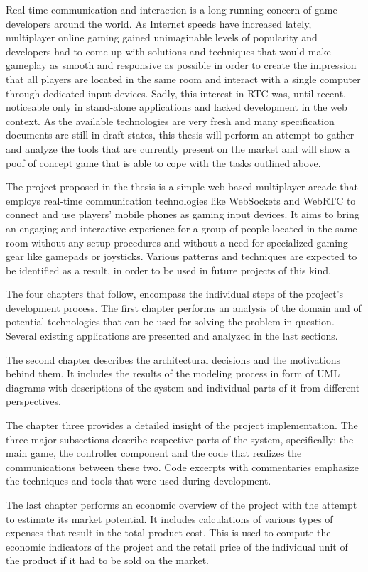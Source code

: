 Real-time communication and interaction is a long-running concern of game
developers around the world. As Internet speeds have increased lately,
multiplayer online gaming gained unimaginable levels of popularity and
developers had to come up with solutions and techniques that would make gameplay
as smooth and responsive as possible in order to create the impression that all
players are located in the same room and interact with a single computer through
dedicated input devices. Sadly, this interest in RTC was, until recent,
noticeable only in stand-alone applications and lacked development in the web
context. As the available technologies are very fresh and many specification
documents are still in draft states, this thesis will perform an attempt to
gather and analyze the tools that are currently present on the market and will
show a poof of concept game that is able to cope with the tasks outlined above.

The project proposed in the thesis is a simple web-based multiplayer arcade that
employs real-time communication technologies like WebSockets and WebRTC to
connect and use players' mobile phones as gaming input devices. It aims to bring
an engaging and interactive experience for a group of people located in the same
room without any setup procedures and without a need for specialized gaming gear
like gamepads or joysticks. Various patterns and techniques are expected to be
identified as a result, in order to be used in future projects of this kind.

The four chapters that follow, encompass the individual steps of the project's
development process. The first chapter performs an analysis of the domain and of
potential technologies that can be used for solving the problem in question.
Several existing applications are presented and analyzed in the last sections.

The second chapter describes the architectural decisions and the motivations
behind them. It includes the results of the modeling process in form of UML
diagrams with descriptions of the system and individual parts of it from
different perspectives.

The chapter three provides a detailed insight of the project implementation. The
three major subsections describe respective parts of the system, specifically:
the main game, the controller component and the code that realizes the
communications between these two. Code excerpts with commentaries emphasize the
techniques and tools that were used during development.

The last chapter performs an economic overview of the project with the attempt
to estimate its market potential. It includes calculations of various types of
expenses that result in the total product cost. This is used to compute the
economic indicators of the project and the retail price of the individual unit
of the product if it had to be sold on the market.

\clearpage
